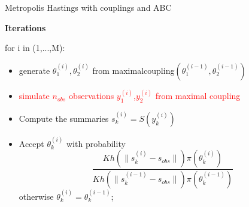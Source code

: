 \documentclass{beamer}
\begin{document}
	\begin{frame}{Metropolis Hastings with couplings and ABC}
	
		\begin{block}{}
			\begin{center}
				\textbf{Iterations} 
			\end{center}
		\end{block}	
		
		for i in (1,...,M):
		\begin{itemize}
			\item generate $\theta_{1}^{(i)},\theta_{2}^{(i)}$  from maximalcoupling$(\theta_{1}^{(i-1)},\theta_{2}^{(i-1)})$
			
			\item \textcolor{red}{simulate $n_{obs}$ observations $ y_{1}^{(i)}$,$ y_{2}^{(i)}$ from maximal coupling}
				
				
		
			\item Compute the summaries  $ s_{k}^{(i)} =S(y_{k}^{(i)})$ 
			
			
			\item Accept $\theta_{k}^{(i)}$ with probability $$\frac{Kh(\|s_{k}^{(i)}-s_{obs}\|)\pi(\theta_{k}^{(i)})}{Kh(\|s_{k}^{(i-1)}- s_{obs}\|)\pi(\theta_{k}^{(i-1)})} $$   otherwise $\theta_{k}^{(i)}=\theta_{k}^{(i-1)}$;
			
			
		\end{itemize}
%				
%				
%				
	\end{frame}
\end{document}
